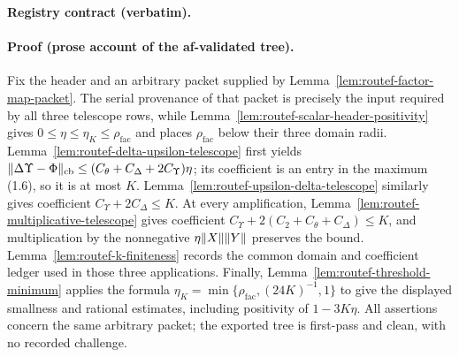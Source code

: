 \noindent\textbf{Registry contract (verbatim).}

\paragraph{Proof (prose account of the af-validated tree).}
Fix the header and an arbitrary packet supplied by Lemma~\ref{lem:routef-factor-map-packet}.
The serial provenance of that packet is precisely the input required by all three telescope
rows, while Lemma~\ref{lem:routef-scalar-header-positivity} gives
$0\le\eta\le\eta_K\le\rho_{\mathrm{fac}}$ and places $\rho_{\mathrm{fac}}$ below their
three domain radii.  Lemma~\ref{lem:routef-delta-upsilon-telescope} first yields
$\lVert \Delta\Upsilon-\Phi\rVert_{\mathrm{cb}}\le
(C_\theta+C_\Delta+2C_\Upsilon)\eta$; its coefficient is an entry in the maximum (1.6),
so it is at most $K$.  Lemma~\ref{lem:routef-upsilon-delta-telescope} similarly gives
coefficient $C_\Upsilon+2C_\Delta\le K$.  At every amplification,
Lemma~\ref{lem:routef-multiplicative-telescope} gives coefficient
$C_\Upsilon+2(C_2+C_\theta+C_\Delta)\le K$, and multiplication by the nonnegative
$\eta\lVert X\rVert\lVert Y\rVert$ preserves the bound.  Lemma~\ref{lem:routef-k-finiteness} records the
common domain and coefficient ledger used in those three applications.  Finally,
Lemma~\ref{lem:routef-threshold-minimum} applies the formula
$\eta_K=\min\{\rho_{\mathrm{fac}},(24K)^{-1},1\}$ to give the displayed smallness and
rational estimates, including positivity of $1-3K\eta$.  All assertions concern the same
arbitrary packet; the exported tree is first-pass and clean, with no recorded challenge.

